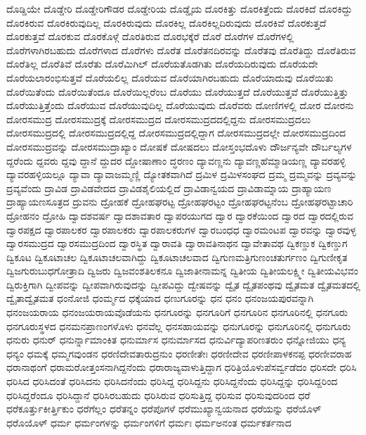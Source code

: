 {ದೊಡ್ಡಿಯೇ
ದೊಡ್ಡೇರಿ
ದೊಡ್ಡೇರಿಗೌಡರ
ದೊಡ್ಡೇರಿಯ
ದೊಡ್ಡೈಯ
ದೊರಕಿತ್ತು
ದೊರಕಿತ್ತೆಂದು
ದೊರಕಿದೆ
ದೊರಕಿದ್ದು
ದೊರಕಿರುವ
ದೊರಕಿರುವುದಿಲ್ಲ
ದೊರಕಿರುವುದು
ದೊರಕಿಲ್ಲ
ದೊರಕಿಲ್ಲದಿರುವುದು
ದೊರಕಿವೆ
ದೊರಕುತ್ತದೆ
ದೊರಕುತ್ತವೆ
ದೊರಕುವ
ದೊರಕೊಳ್ಗೆ
ದೊರತಿರುವ
ದೊರಭಕ್ಕೆರೆ
ದೊರೆ
ದೊರೆಗಳ
ದೊರೆಗಳಲ್ಲಿ
ದೊರೆಗಳಾಗಿರಬಹುದು
ದೊರೆಗಳಾದ
ದೊರೆಗಳು
ದೊರೆತ
ದೊರೆತನದಿರವನ್ನು
ದೊರೆತವು
ದೊರೆತಿದ್ದು
ದೊರೆತಿರುವ
ದೊರೆತಿಲ್ಲ
ದೊರೆತಿವೆ
ದೊರೆತು
ದೊರೆಮಿಗಿಲ್
ದೊರೆಯತೊಡಗಿತು
ದೊರೆಯದಿರುವುದು
ದೊರೆಯದೇ
ದೊರೆಯಲಾರಂಭಿಸುತ್ತವೆ
ದೊರೆಯಲಿಲ್ಲ
ದೊರೆಯವ
ದೊರೆಯಾಗಿರಬಹುದು
ದೊರೆಯಾದುವು
ದೊರೆಯಿತು
ದೊರೆಯಿತೆಂದು
ದೊರೆಯಿತೆಂದೂ
ದೊರೆಯಿಲ್ಲರೆಂಬ
ದೊರೆಯು
ದೊರೆಯುತ್ತದೆ
ದೊರೆಯುತ್ತವೆ
ದೊರೆಯುತ್ತಿತ್ತು
ದೊರೆಯುತ್ತಿತ್ತೆಂದು
ದೊರೆಯುವ
ದೊರೆಯುವುದಿಲ್ಲ
ದೊರೆಯುವುದು
ದೊರೆವರು
ದೋಣಿಗಳಲ್ಲಿ
ದೋರ
ದೋರನು
ದೋರಸಮುದ್ರ
ದೋರಸಮುದ್ರಕ್ಕೆ
ದೋರಸಮುದ್ರದ
ದೋರಸಮುದ್ರದದಲ್ಲಿದ್ದನು
ದೋರಸಮುದ್ರದಲು
ದೋರಸಮುದ್ರದಲ್ಲಿ
ದೋರಸಮುದ್ರದಲ್ಲಿದ್ದ
ದೋರಸಮುದ್ರದಲ್ಲಿದ್ದಾಗ
ದೋರಸಮುದ್ರದಲ್ಲೇ
ದೋರಸಮುದ್ರದಿಂದ
ದೋರಸಮುದ್ರವನ್ನು
ದೋರಸಮುದ್ರಾಖ್ಯಾಂ
ದೋಷಕೆ
ದೋಷದಲು
ದೋಸ್ತಂಭದೊಳು
ದೌರ್ಜನ್ಯವೇ
ದೌರ್ಬಲ್ಯಗಳ
ದ್ದರೆಂದು
ದ್ದವರು
ದ್ದವು
ದ್ದಾನೆ
ದ್ದುದರ
ದ್ದೋಷಾಣಾಂ
ದ್ಧರಣಂ
ದ್ಯಾವಣ್ಣನು
ದ್ಯಾವಣ್ಣಹೆಮ್ಮಾಡಿಯಣ್ಣ
ದ್ಯಾವರಹಳ್ಳಿ
ದ್ಯಾವರಹಳ್ಳಿಯಲ್ಲೂ
ದ್ಯಾವಾ
ದ್ಯಾವಾಜಮ್ಮಣ್ಣಿ
ದ್ಯೋತಕವಾಗಿದೆ
ದ್ರಮಿಳ
ದ್ರಮಿಳಸಂಘದ
ದ್ರಮ್ಮ
ದ್ರಮ್ಮವನ್ನು
ದ್ರವ್ಯವನ್ನು
ದ್ರವ್ಯವೆಂದು
ದ್ರಾವಿಡ
ದ್ರಾವಿಡವೇದದ
ದ್ರಾವಿಡಶೈಲಿಯಲ್ಲಿದೆ
ದ್ರಾವಿಡಾನ್ವಯದ
ದ್ರಾವಿಡಾಮ್ನಾಯ
ದ್ರಾಹ್ಯಾಯಣ
ದ್ರಾಹ್ಯಾಯಣಸೂತ್ರದ
ದ್ರುವನು
ದ್ರೋಹಕೆ
ದ್ರೋಹಘರಟ್ಟ
ದ್ರೋಹಘರಟ್ಟಂ
ದ್ರೋಹಘರಟ್ಟನೆಂಬ
ದ್ರೋಹಘರಟ್ಟಾಚಾರಿ
ದ್ರೋಹನಂ
ದ್ರೋಹಿ
ದ್ವಾದಶವರ್ಷ
ದ್ವಾದಶಾವತಾರ
ದ್ವಾಪರಯುಗದ
ದ್ವಾರ
ದ್ವಾರಕೆಯಿಂದ
ದ್ವಾರದ
ದ್ವಾರದಲ್ಲಿರುವ
ದ್ವಾರಪಕ್ಷದ
ದ್ವಾರಪಾಲಕರ
ದ್ವಾರಪಾಲಕರು
ದ್ವಾರಪಾಲಕರುಗಳ
ದ್ವಾರಬಂಧಧ
ದ್ವಾರಮಂಟಪ
ದ್ವಾರವನ್ನು
ದ್ವಾರವುಳ್ಳ
ದ್ವಾರಸಮುದ್ರದ
ದ್ವಾರಸಮುದ್ರದಿಂದ
ದ್ವಾರಸ್ಥಿತ
ದ್ವಾರಾವತಿ
ದ್ವಾರಾವತಿನಾಥನ
ದ್ವಾವೇತಾವಥ
ದ್ವಿಕಣ್ಡುಕ
ದ್ವಿಕಣ್ಡುಗ
ದ್ವಿಕೂಟ
ದ್ವಿಕೂಟಾಚಲ
ದ್ವಿಕೂಟಾಚಲವಾಗಿದ್ದು
ದ್ವಿಕೂಟಾಚಲವಾದ
ದ್ವಿಗುಣಮತ್ರಿಗುಣಂಚತುರ್ಗಣಂ
ದ್ವಿಗುಣೀಕೃತ
ದ್ವಿಜಗುರುಬುಧಗೋತ್ರಾದಿ
ದ್ವಿಜರು
ದ್ವಿಜವಂಶತಿಲಕನೂ
ದ್ವಿಜಾತೀನಾಮನ್ನ
ದ್ವಿತೀಯ
ದ್ವಿತೀಯಲಕ್ಷ್ಮೀ
ದ್ವಿತೀಯವಿಭವಂ
ದ್ವಿರುಕ್ತಿಗಾಗಿ
ದ್ವೀಪವನ್ನು
ದ್ವೀಪವಾಗಿರುವುದನ್ನು
ದ್ವೀಪವಿದ್ದು
ದ್ವೇಷವನ್ನು
ದ್ವೈತ
ದ್ವೈತಪಂಥವು
ದ್ವೈತಮತ
ದ್ವೈತಮತದಲ್ಲಿ
ದ್ವೈತಾದ್ವೈತಮತ
ಧಂನೋಜಿ
ಧಂರ್ಮ್ಮದ
ಧಕ್ಕೆಯಾದ
ಧಣುಗೂರನ್ನು
ಧನ
ಧನಂ
ಧನಂಜಯಪುರವನ್ನಾಗಿ
ಧನಂಜಯರಾಯ
ಧನಂಜಯರಾಯವೊಡೆಯನು
ಧನಗೂರನ್ನು
ಧನಗೂರಿಗೆ
ಧನಗೂರಿನ
ಧನಗೂರಿನಲ್ಲಿ
ಧನಗೂರು
ಧನಗೂರುಸ್ಥಳದ
ಧನಮನಪ್ರಾಣಂಗಳೊಳು
ಧನವೆಲ್ಲ
ಧನಸಹಾಯವನ್ನು
ಧನುಗೂರನ್ನು
ಧನುಗೂರಿನಲ್ಲಿ
ಧನುಗೂರು
ಧನುರು
ಧನುರ್
ಧನುರ್ನ್ನಾಮಾಂಕಿತ
ಧನುರ್ಮಾಸ
ಧನುರ್ಮಾಸದ
ಧನುರ್ವಿದ್ಯಾಪರಿಣತರುಂ
ಧನ್ನೋಜಿಯು
ಧನ್ಯ
ಧನ್ಯಂ
ಧಮಕ್ಕೆ
ಧಮ್ಮಗವುಂಡನ
ಧರಣಿದೇವತಾರುದ್ರನುಂ
ಧರಣೀತೇಃ
ಧರಣೀದೇವ
ಧರಣೀಪಾಳಕನಪ್ಪ
ಧರಣೀವರಾಹ
ಧರಾನಾಥಂಗೆ
ಧರಾಮರೋತ್ತಂಸನಾಗಿದ್ದನೆಂದು
ಧರಾರಾಜ್ಯವಾಳುತ್ತಿದ್ದಾಗ
ಧರಿತ್ರಿಯೊಳುಪೆಸರ್ವ್ವಡೆದಂ
ಧರಿಸದೇ
ಧರಿಸಿ
ಧರಿಸಿದ
ಧರಿಸಿದಂತೆ
ಧರಿಸಿದನು
ಧರಿಸಿದನೆಂದು
ಧರಿಸಿದ್ದ
ಧರಿಸಿದ್ದನು
ಧರಿಸಿದ್ದನೆಂದು
ಧರಿಸಿದ್ದನ್ನು
ಧರಿಸಿದ್ದರಿಂದ
ಧರಿಸಿದ್ದರೆಂದೂ
ಧರಿಸಿದ್ದಾನೆ
ಧರಿಸಿರಬಹುದು
ಧರಿಸಿರುವ
ಧರಿಸುತ್ತಿದ್ದ
ಧರಿಸುವ
ಧರಿಸುವುದರಿಂದ
ಧರೆ
ಧರೆಕೂರ್ತ್ತುಕೀರ್ತ್ತಿಕುಂ
ಧರೆಗೆಲ್ಲಂ
ಧರೆತನ್ನಂ
ಧರೆಪೊಗಳೆ
ಧರೆಮುಖ್ಯಾನ್ವಯನಾದ
ಧರೆಯನ್ನು
ಧರೆಯೊಳ್
ಧರೊಯೊಳ್
ಧರ್ಮ
ಧರ್ಮಂಗಳನ್ನು
ಧರ್ಮಂಗಳಿಗೆ
ಧರ್ಮಃ
ಧರ್ಮಅನಂತ
ಧರ್ಮಕರ್ತನಾದ
}
